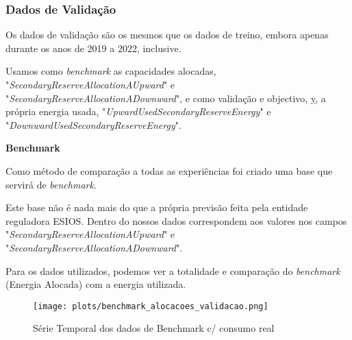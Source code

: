 \subsubsection{Dados de Validação}
Os dados de validação são os mesmos que os dados de treino, embora apenas durante os anos de 2019 a 2022, inclusive.\par
Usamos como \textit{benchmark} as capacidades alocadas, "\textit{SecondaryReserveAllocationAUpward}" e "\textit{SecondaryReserveAllocationADownward}", e como validação e objectivo, \hyperref[se:metneuralnet]{y}, a própria energia usada, "\textit{UpwardUsedSecondaryReserveEnergy}" e "\textit{DownwardUsedSecondaryReserveEnergy}".

\textbf{Benchmark}

Como método de comparação a todas as experiências foi criado uma base que servirá de \textit{benchmark}.\par
Este base não é nada mais do que a própria previsão feita pela entidade reguladora \gls{ESIOS}. Dentro do nossos dados correspondem aos valores nos campos "\textit{SecondaryReserveAllocationAUpward}" e "\textit{SecondaryReserveAllocationADownward}".\par
Para os dados utilizados, podemos ver a totalidade e comparação do \textit{benchmark} (Energia Alocada) com a energia utilizada.\par

\begin{figure}[H]
    \centering
    \texttt{[image: plots/benchmark\_alocacoes\_validacao.png]}
    \caption{Série Temporal dos dados de Benchmark c/ consumo real}
    \label{fig:benchmarktimeseries}
\end{figure}

